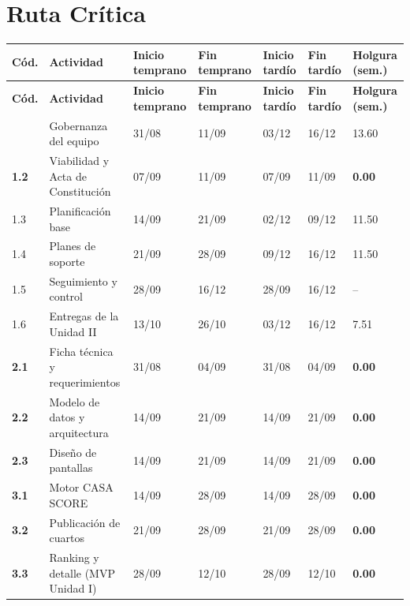 \documentclass[11pt,a4paper]{article}
\begin{document}
\section{Ruta Crítica}
{\small
\setlength{\tabcolsep}{3pt}
\begin{longtable}{@{}P{0.75cm} >{\raggedright\arraybackslash}p{5.2cm} C{1.6cm} C{1.6cm} C{1.6cm} C{1.6cm} Q{1.3cm}@{}}
\toprule
{}
\textbf{Cód.} & \textbf{Actividad} & \textbf{Inicio temprano} & \textbf{Fin temprano} & \textbf{Inicio tardío} & \textbf{Fin tardío} & \textbf{Holgura (sem.)} \\
\midrule
\endfirsthead
\toprule
{}
\textbf{Cód.} & \textbf{Actividad} & \textbf{Inicio temprano} & \textbf{Fin temprano} & \textbf{Inicio tardío} & \textbf{Fin tardío} & \textbf{Holgura (sem.)} \\
\midrule
\endhead
\bottomrule
{} & Gobernanza del equipo & 31/08 & 11/09 & 03/12 & 16/12 & 13.60 \\
\textbf{1.2} & Viabilidad y Acta de Constitución & 07/09 & 11/09 & 07/09 & 11/09 & \textcolor{RaciR}{\textbf{0.00}} \\
1.3 & Planificación base & 14/09 & 21/09 & 02/12 & 09/12 & 11.50 \\
1.4 & Planes de soporte & 21/09 & 28/09 & 09/12 & 16/12 & 11.50 \\
1.5 & Seguimiento y control & 28/09 & 16/12 & 28/09 & 16/12 & -- \\
1.6 & Entregas de la Unidad II & 13/10 & 26/10 & 03/12 & 16/12 & 7.51 \\
\textbf{2.1} & Ficha técnica y requerimientos & 31/08 & 04/09 & 31/08 & 04/09 & \textcolor{RaciR}{\textbf{0.00}} \\
\textbf{2.2} & Modelo de datos y arquitectura & 14/09 & 21/09 & 14/09 & 21/09 & \textcolor{RaciR}{\textbf{0.00}} \\
\textbf{2.3} & Diseño de pantallas & 14/09 & 21/09 & 14/09 & 21/09 & \textcolor{RaciR}{\textbf{0.00}} \\
\textbf{3.1} & Motor CASA SCORE & 14/09 & 28/09 & 14/09 & 28/09 & \textcolor{RaciR}{\textbf{0.00}} \\
\textbf{3.2} & Publicación de cuartos & 21/09 & 28/09 & 21/09 & 28/09 & \textcolor{RaciR}{\textbf{0.00}} \\
\textbf{3.3} & Ranking y detalle (MVP Unidad I) & 28/09 & 12/10 & 28/09 & 12/10 & \textcolor{RaciR}{\textbf{0.00}} \\

\end{longtable}}
\end{document}
